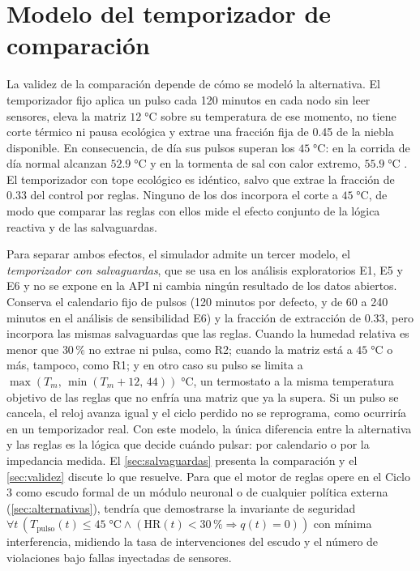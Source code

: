 \section{Modelo del temporizador de comparaci\'on}
\label{sec:modelo_temporizador}
La validez de la comparaci\'on depende de c\'omo se model\'o la alternativa. El temporizador fijo aplica un pulso cada 120 minutos en cada nodo sin leer sensores, eleva la matriz $12\;\si{\celsius}$ sobre su temperatura de ese momento, no tiene corte t\'ermico ni pausa ecol\'ogica y extrae una fracci\'on fija de 0.45 de la niebla disponible. En consecuencia, de d\'ia sus pulsos superan los $45\;\si{\celsius}$: en la corrida de d\'ia normal alcanzan $52.9\;\si{\celsius}$ y en la tormenta de sal con calor extremo, $55.9\;\si{\celsius}$ \parencite[doc.~04, \S~5.5]{axioma2026engine}. El temporizador con tope ecol\'ogico es id\'entico, salvo que extrae la fracci\'on de 0.33 del control por reglas. Ninguno de los dos incorpora el corte a $45\;\si{\celsius}$, de modo que comparar las reglas con ellos mide el efecto conjunto de la l\'ogica reactiva y de las salvaguardas.

Para separar ambos efectos, el simulador admite un tercer modelo, el \emph{temporizador con salvaguardas}, que se usa en los an\'alisis exploratorios E1, E5 y E6 y no se expone en la API ni cambia ning\'un resultado de los datos abiertos. Conserva el calendario fijo de pulsos (120 minutos por defecto, y de 60 a 240 minutos en el an\'alisis de sensibilidad E6) y la fracci\'on de extracci\'on de 0.33, pero incorpora las mismas salvaguardas que las reglas. Cuando la humedad relativa es menor que $30\,\%$ no extrae ni pulsa, como R2; cuando la matriz est\'a a $45\;\si{\celsius}$ o m\'as, tampoco, como R1; y en otro caso su pulso se limita a $\max(T_m,\,\min(T_m + 12,\, 44))\;\si{\celsius}$, un termostato a la misma temperatura objetivo de las reglas que no enfr\'ia una matriz que ya la supera. Si un pulso se cancela, el reloj avanza igual y el ciclo perdido no se reprograma, como ocurrir\'ia en un temporizador real. Con este modelo, la \'unica diferencia entre la alternativa y las reglas es la l\'ogica que decide cu\'ando pulsar: por calendario o por la impedancia medida. El \cref{sec:salvaguardas} presenta la comparaci\'on y el \cref{sec:validez} discute lo que resuelve. Para que el motor de reglas opere en el Ciclo 3 como escudo formal de un m\'odulo neuronal o de cualquier pol\'itica externa (\cref{sec:alternativas}), tendr\'ia que demostrarse la invariante de seguridad $\forall t\,(T_{\text{pulso}}(t) \le 45\;\si{\celsius} \land (\text{HR}(t) < 30\,\% \Rightarrow q(t) = 0))$ con m\'inima interferencia, midiendo la tasa de intervenciones del escudo y el n\'umero de violaciones bajo fallas inyectadas de sensores.

